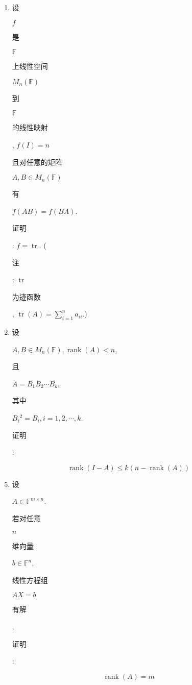 \documentclass[10pt]{article}
\begin{document}
\begin{enumerate}
  \item \begin{CJK}{UTF8}{mj}设\end{CJK} $f$ \begin{CJK}{UTF8}{mj}是\end{CJK} $\mathbb{F}$ \begin{CJK}{UTF8}{mj}上线性空间\end{CJK} $M_{n}(\mathbb{F})$ \begin{CJK}{UTF8}{mj}到\end{CJK} $\mathbb{F}$ \begin{CJK}{UTF8}{mj}的线性映射\end{CJK}, $f(I)=n$ \begin{CJK}{UTF8}{mj}且对任意的矩阵\end{CJK} $A, B \in M_{n}(\mathbb{F})$ \begin{CJK}{UTF8}{mj}有\end{CJK} $f(A B)=f(B A)$. \begin{CJK}{UTF8}{mj}证明\end{CJK}: $f=\operatorname{tr}$. (\begin{CJK}{UTF8}{mj}注\end{CJK}: $\operatorname{tr}$ \begin{CJK}{UTF8}{mj}为迹函数\end{CJK}, $\operatorname{tr}(A)=\sum_{i=1}^{n} a_{i i}$.)

  \item \begin{CJK}{UTF8}{mj}设\end{CJK} $A, B \in M_{n}(\mathbb{F}), \operatorname{rank}(A)<n$, \begin{CJK}{UTF8}{mj}且\end{CJK} $A=B_{1} B_{2} \cdots B_{k}$, \begin{CJK}{UTF8}{mj}其中\end{CJK} $B_{i}{ }^{2}=B_{i}, i=1,2, \cdots, k$. \begin{CJK}{UTF8}{mj}证明\end{CJK}:

\end{enumerate}
$$
\operatorname{rank}(I-A) \leq k(n-\operatorname{rank}(A))
$$

\begin{enumerate}
  \setcounter{enumi}{4}
  \item \begin{CJK}{UTF8}{mj}设\end{CJK} $A \in \mathbb{F}^{m \times n}$. \begin{CJK}{UTF8}{mj}若对任意\end{CJK} $n$ \begin{CJK}{UTF8}{mj}维向量\end{CJK} $b \in \mathbb{F}^{n}$, \begin{CJK}{UTF8}{mj}线性方程组\end{CJK} $A X=b$ \begin{CJK}{UTF8}{mj}有解\end{CJK}. \begin{CJK}{UTF8}{mj}证明\end{CJK}:
\end{enumerate}
$$
\operatorname{rank}(A)=m
$$
\end{document}
